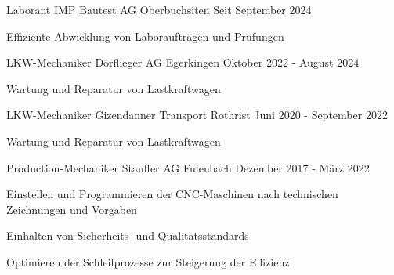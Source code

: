 

\begin{cventries}



\cventry
  {Laborant} %
  {IMP Bautest AG} %
  {Oberbuchsiten} %
  {Seit September 2024} %
  {
    \begin{cvitems} %
      \item {Effiziente Abwicklung von Laboraufträgen und Prüfungen}
    \end{cvitems}
  }

\cventry
  {LKW-Mechaniker} %
  {Dörflieger AG} %
  {Egerkingen} %
  {Oktober 2022 - August 2024} %
  {
    \begin{cvitems} %
      \item {Wartung und Reparatur von Lastkraftwagen}
    \end{cvitems}
  }
  
  

\cventry
  {LKW-Mechaniker} %
  {Gizendanner Transport} %
  {Rothrist} %
  {Juni 2020 - September 2022} %
  {
    \begin{cvitems} %
      \item {Wartung und Reparatur von Lastkraftwagen}
    \end{cvitems}
  }

\cventry
  {Production-Mechaniker} %
  {Stauffer AG} %
  {Fulenbach} %
  {Dezember 2017 - März 2022} %
  {
    \begin{cvitems} %
      \item {Einstellen und Programmieren der CNC-Maschinen nach technischen Zeichnungen und Vorgaben}
      \item {Einhalten von Sicherheits- und Qualitätsstandards}
      \item {Optimieren der Schleifprozesse zur Steigerung der Effizienz}
    \end{cvitems}
  }


\end{cventries}
